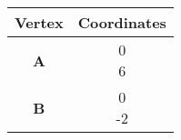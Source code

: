 \begin{tabular}[12pt]{ |c| c|}
    \hline
    \textbf{Vertex} & \textbf{Coordinates}\\ 
    \hline
    \textbf{A} & \myvec{0 \\ 6} \\
    \hline 
    \textbf{B} & \myvec{0 \\ -2}\\
    \hline
    \end{tabular}
